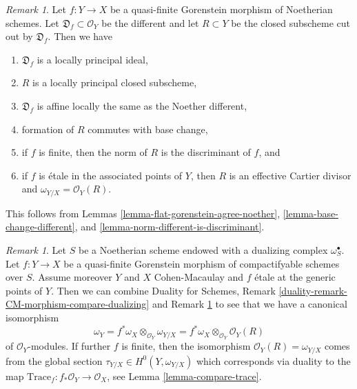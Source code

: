\documentclass{stacks-project}
\theoremstyle{plain}
\theoremstyle{definition}
\theoremstyle{remark}
\newtheorem{remark}[subsection]{Remark}
\numberwithin{equation}{subsection}
\begin{document}
\begin{remark}
\label{remark-collect-results-qf-gorenstein}
Let $f : Y \to X$ be a quasi-finite Gorenstein morphism of Noetherian schemes.
Let $\mathfrak D_f \subset \mathcal{O}_Y$ be the different and let
$R \subset Y$ be the closed subscheme cut out by $\mathfrak D_f$.
Then we have
\begin{enumerate}
\item $\mathfrak D_f$ is a locally principal ideal,
\item $R$ is a locally principal closed subscheme,
\item $\mathfrak D_f$ is affine locally the same as the Noether different,
\item formation of $R$ commutes with base change,
\item if $f$ is finite, then the norm of $R$ is the discriminant of $f$, and
\item if $f$ is \'etale in the associated points of $Y$, then
$R$ is an effective Cartier divisor and $\omega_{Y/X} = \mathcal{O}_Y(R)$.
\end{enumerate}
This follows from Lemmas \ref{lemma-flat-gorenstein-agree-noether},
\ref{lemma-base-change-different}, and
\ref{lemma-norm-different-is-discriminant}.
\end{remark}

\begin{remark}
\label{remark-collect-results-qf-gorenstein-two}
Let $S$ be a Noetherian scheme endowed with a dualizing complex
$\omega_S^\bullet$. Let $f : Y \to X$ be a quasi-finite Gorenstein
morphism of compactifyable schemes over $S$. Assume moreover
$Y$ and $X$ Cohen-Macaulay and $f$ \'etale at the generic
points of $Y$. Then we can combine
Duality for Schemes, Remark
\ref{duality-remark-CM-morphism-compare-dualizing} and
Remark \ref{remark-collect-results-qf-gorenstein}
to see that we have a canonical isomorphism
$$
\omega_Y = f^*\omega_X \otimes_{\mathcal{O}_Y} \omega_{Y/X} =
f^*\omega_X \otimes_{\mathcal{O}_Y} \mathcal{O}_Y(R)
$$
of $\mathcal{O}_Y$-modules. If further $f$ is finite,
then the isomorphism $\mathcal{O}_Y(R) = \omega_{Y/X}$ comes
from the global section $\tau_{Y/X} \in H^0(Y, \omega_{Y/X})$
which corresponds via duality to the map
$\text{Trace}_f : f_*\mathcal{O}_Y \to \mathcal{O}_X$, see
Lemma \ref{lemma-compare-trace}.
\end{remark}










\end{document}
